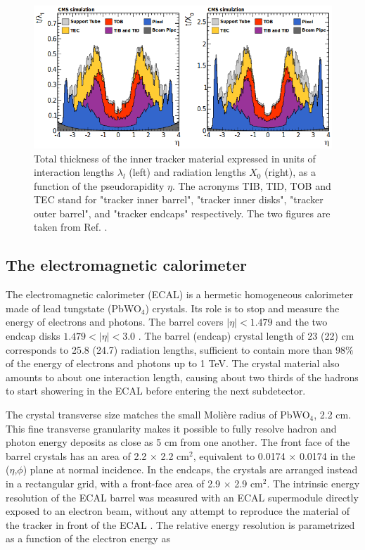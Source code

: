 \begin{figure}
    \centering
    \includegraphics[width=\textwidth]{Images/trackerthickness.png}
    \caption{Total thickness of the inner tracker material expressed in units of interaction lengths $\lambda_{l}$ (left) and radiation lengths $X_{0}$ (right), as a function of the pseudorapidity $\eta$. The acronyms TIB, TID, TOB and TEC stand for "tracker inner barrel", "tracker inner disks", "tracker outer barrel", and "tracker endcaps" respectively. The two figures are taken from Ref. \cite{Collaboration_2014}.}
    \label{fig:tracker_material}
\end{figure}

\subsection{The electromagnetic calorimeter}

The electromagnetic calorimeter (ECAL) \cite{CERN-LHCC-97-033,Bloch:581342} is a hermetic homogeneous calorimeter made of lead tungstate (PbWO$_4$) crystals. Its role is to stop and measure the energy of electrons and photons. The barrel covers $|\eta| < 1.479$ and the two endcap disks $1.479 < |\eta| < 3.0$ . The barrel (endcap) crystal length of 23 (22) cm corresponds to 25.8 (24.7) radiation lengths, sufficient to contain more than $98\%$ of the energy of electrons and photons up to 1 TeV. The crystal material also amounts to about one interaction length, causing about two thirds of the hadrons to start showering in the ECAL before entering the next subdetector.

The crystal transverse size matches the small Molière radius of PbWO$_4$, 2.2 cm. This fine transverse granularity makes it possible to fully resolve hadron and photon energy deposits as close as 5 cm from one another. The front face of the barrel crystals has an area of 2.2 $\times$ 2.2 cm$^2$, equivalent to 0.0174 $\times$ 0.0174 in the ($\eta$,$\phi$) plane at normal incidence. In the endcaps, the crystals are arranged instead in a rectangular grid, with a front-face area of 2.9 $\times$ 2.9 cm$^2$. The intrinsic energy resolution of the ECAL barrel was measured with an ECAL supermodule directly exposed to an electron beam, without any attempt to reproduce the material of the tracker in front of the ECAL \cite{Ingram_2007}. The relative energy resolution is parametrized as a function of the electron energy as 

